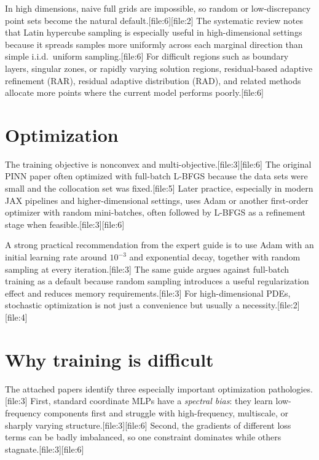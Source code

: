\documentclass[11pt]{report}
\begin{document}
In high dimensions, naive full grids are impossible, so random or low-discrepancy point sets become the natural default.[file:6][file:2]  
The systematic review notes that Latin hypercube sampling is especially useful in high-dimensional settings because it spreads samples more uniformly across each marginal direction than simple i.i.d.\ uniform sampling.[file:6]  
For difficult regions such as boundary layers, singular zones, or rapidly varying solution regions, residual-based adaptive refinement (RAR), residual adaptive distribution (RAD), and related methods allocate more points where the current model performs poorly.[file:6]

\section{Optimization}

The training objective is nonconvex and multi-objective.[file:3][file:6]  
The original PINN paper often optimized with full-batch L-BFGS because the data sets were small and the collocation set was fixed.[file:5]  
Later practice, especially in modern JAX pipelines and higher-dimensional settings, uses Adam or another first-order optimizer with random mini-batches, often followed by L-BFGS as a refinement stage when feasible.[file:3][file:6]

A strong practical recommendation from the expert guide is to use Adam with an initial learning rate around \(10^{-3}\) and exponential decay, together with random sampling at every iteration.[file:3]  
The same guide argues against full-batch training as a default because random sampling introduces a useful regularization effect and reduces memory requirements.[file:3]  
For high-dimensional PDEs, stochastic optimization is not just a convenience but usually a necessity.[file:2][file:4]

\section{Why training is difficult}

The attached papers identify three especially important optimization pathologies.[file:3]  
First, standard coordinate MLPs have a \emph{spectral bias}: they learn low-frequency components first and struggle with high-frequency, multiscale, or sharply varying structure.[file:3][file:6]  
Second, the gradients of different loss terms can be badly imbalanced, so one constraint dominates while others stagnate.[file:3][file:6]
\end{document}

